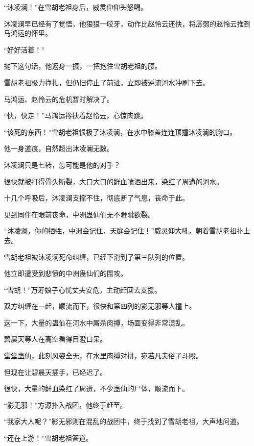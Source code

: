 
\begin{this_body}



“沐凌澜！”在雪胡老祖身后，威灵仰仰头怒喝。

沐凌澜早已经有了觉悟，他狠狠一咬牙，动作比赵怜云还快，将孱弱的赵怜云推到马鸿运的怀里。

“好好活着！”

抛下这句话，他返身一振，一把抱住雪胡老祖的腰。

雪胡老祖极力挣扎，但仍旧停止了前进，立即被逆流河水冲刷下去。

马鸿运、赵怜云的危机暂时解决了。

“快，快走！”马鸿运搀扶着赵怜云，心惊肉跳。

“该死的东西！”雪胡老祖恨极了沐凌澜，在水中膝盖连连顶撞沐凌澜的胸口。

他一身道痕，自然超出沐凌澜无数。

沐凌澜只是七转，怎可能是他的对手？

很快就被打得骨头断裂，大口大口的鲜血喷洒出来，染红了周遭的河水。

十几个呼吸后，沐凌澜支撑不住，彻底断了气息，丧命于此。

见到同伴在眼前丧命，中洲蛊仙们无不睚眦欲裂。

“沐凌澜，你的牺牲，中洲会记住，天庭会记住！”威灵仰大吼，朝着雪胡老祖扑上去。

雪胡老祖被沐凌澜死命纠缠，已经下滑到了第三队列的位置。

他立即遭受到悲愤的中洲蛊仙们的围攻。

“雪胡！”万寿娘子心忧丈夫安危，主动赶回去支援。

双方纠缠在一起，顺流而下，很快和第四列的影无邪等人撞上。

这一下，大量的蛊仙在河水中厮杀肉搏，场面变得非常混乱。

碧晨天等人在高空看得目瞪口呆。

堂堂蛊仙，此刻风姿全无，在水里肉搏对拼，宛若凡夫俗子斗殴。

但现在让碧晨天插手，已经迟了。

很快，大量的鲜血染红了周遭，不少蛊仙的尸体，顺流而下。

“影无邪！”方源扑入战团，他终于赶至。

“我家大人呢？”影无邪则在混乱的战团中，终于找到了雪胡老祖，大声地问道。

“还在上游！”雪胡老祖答道。


\end{this_body}

